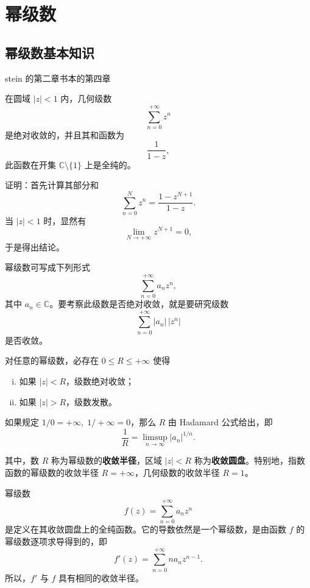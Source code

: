 \documentclass[lang=cn,10pt]{elegantbook}
\begin{document}
\chapter{幂级数}
\section{幂级数基本知识}stein  的第二章书本的第四章
\begin{proposition}
在圆域 $|z| < 1$ 内，几何级数
\[
\sum_{n=0}^{+\infty} z^n
\]
是绝对收敛的，并且其和函数为
\[
\frac{1}{1-z},
\]
此函数在开集 $\mathbb{C} \setminus \{1\}$ 上是全纯的。

证明：首先计算其部分和
\[
\sum_{n=0}^{N} z^n = \frac{1 - z^{N+1}}{1-z}.
\]
当 $|z| < 1$ 时，显然有
\[
\lim_{N \to +\infty} z^{N+1} = 0,
\]
于是得出结论。
\end{proposition}
\begin{definition}
幂级数可写成下列形式
\[
\sum_{n=0}^{+\infty} a_n z^n,
\]
其中 $a_n \in \mathbb{C}$。要考察此级数是否绝对收敛，就是要研究级数
\[
\sum_{n=0}^{+\infty} \lvert a_n \rvert \, \lvert z^n \rvert
\]
是否收敛。
\end{definition}
\begin{theorem}[2.5收敛半径内绝对收敛]
对任意的幂级数，必存在 $0 \leq R \leq +\infty$ 使得  
\begin{enumerate}[(i)]
  \item 如果 $|z| < R$，级数绝对收敛；
  \item 如果 $|z| > R$，级数发散。
\end{enumerate}
如果规定 $1/0 = +\infty, \; 1 / +\infty = 0$，那么 $R$ 由 Hadamard 公式给出，即
\[
\frac{1}{R} = \limsup_{n \to \infty} \lvert a_n \rvert^{1/n}.
\]

其中，数 $R$ 称为幂级数的\textbf{收敛半径}，区域 $|z| < R$ 称为\textbf{收敛圆盘}。特别地，指数函数的幂级数的收敛半径 $R = +\infty$，几何级数的收敛半径 $R = 1$。
\end{theorem}
\begin{theorem}[2.6函数和自己的导数的收敛半径一样大]
幂级数
\[
f(z) = \sum_{n=0}^{+\infty} a_n z^n
\]
是定义在其收敛圆盘上的全纯函数。它的导数依然是一个幂级数，是由函数 $f$ 的幂级数逐项求导得到的，即
\[
f'(z) = \sum_{n=0}^{+\infty} n a_n z^{n-1}.
\]
所以，$f'$ 与 $f$ 具有相同的收敛半径。
\end{theorem}
\end{document}
